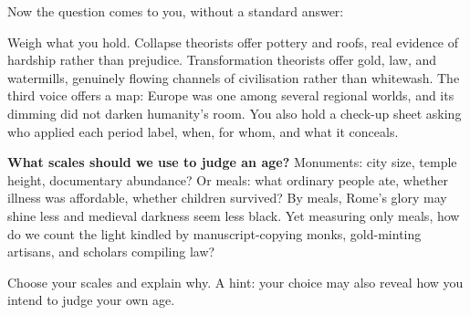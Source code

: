 Now the question comes to you, without a standard answer:

Weigh what you hold. Collapse theorists offer pottery and roofs, real evidence of hardship rather than prejudice. Transformation theorists offer gold, law, and watermills, genuinely flowing channels of civilisation rather than whitewash. The third voice offers a map: Europe was one among several regional worlds, and its dimming did not darken humanity's room. You also hold a check-up sheet asking who applied each period label, when, for whom, and what it conceals.

\textbf{What scales should we use to judge an age?} Monuments: city size, temple height, documentary abundance? Or meals: what ordinary people ate, whether illness was affordable, whether children survived? By meals, Rome's glory may shine less and medieval darkness seem less black. Yet measuring only meals, how do we count the light kindled by manuscript-copying monks, gold-minting artisans, and scholars compiling law?

Choose your scales and explain why. A hint: your choice may also reveal how you intend to judge your own age.
